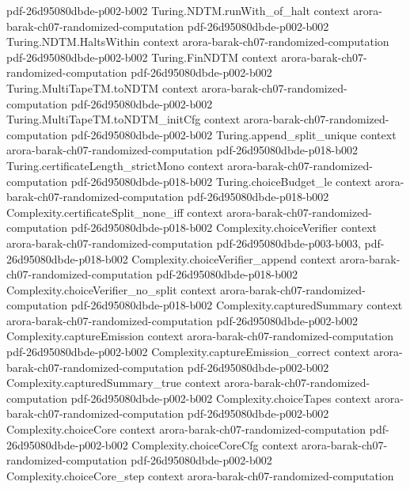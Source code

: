 \begin{theorem}
  {pdf-26d95080dbde-p002-b002}
\proofstep
  {Turing.NDTM.runWith_of_halt}
  {context}
  {arora-barak-ch07-randomized-computation}
  {pdf-26d95080dbde-p002-b002}
\proofstep
  {Turing.NDTM.HaltsWithin}
  {context}
  {arora-barak-ch07-randomized-computation}
  {pdf-26d95080dbde-p002-b002}
\proofstep
  {Turing.FinNDTM}
  {context}
  {arora-barak-ch07-randomized-computation}
  {pdf-26d95080dbde-p002-b002}
\proofstep
  {Turing.MultiTapeTM.toNDTM}
  {context}
  {arora-barak-ch07-randomized-computation}
  {pdf-26d95080dbde-p002-b002}
\proofstep
  {Turing.MultiTapeTM.toNDTM_initCfg}
  {context}
  {arora-barak-ch07-randomized-computation}
  {pdf-26d95080dbde-p002-b002}
\proofstep
  {Turing.append_split_unique}
  {context}
  {arora-barak-ch07-randomized-computation}
  {pdf-26d95080dbde-p018-b002}
\proofstep
  {Turing.certificateLength_strictMono}
  {context}
  {arora-barak-ch07-randomized-computation}
  {pdf-26d95080dbde-p018-b002}
\proofstep
  {Turing.choiceBudget_le}
  {context}
  {arora-barak-ch07-randomized-computation}
  {pdf-26d95080dbde-p018-b002}
\proofstep
  {Complexity.certificateSplit_none_iff}
  {context}
  {arora-barak-ch07-randomized-computation}
  {pdf-26d95080dbde-p018-b002}
\proofstep
  {Complexity.choiceVerifier}
  {context}
  {arora-barak-ch07-randomized-computation}
  {pdf-26d95080dbde-p003-b003,
    pdf-26d95080dbde-p018-b002}
\proofstep
  {Complexity.choiceVerifier_append}
  {context}
  {arora-barak-ch07-randomized-computation}
  {pdf-26d95080dbde-p018-b002}
\proofstep
  {Complexity.choiceVerifier_no_split}
  {context}
  {arora-barak-ch07-randomized-computation}
  {pdf-26d95080dbde-p018-b002}
\proofstep
  {Complexity.capturedSummary}
  {context}
  {arora-barak-ch07-randomized-computation}
  {pdf-26d95080dbde-p002-b002}
\proofstep
  {Complexity.captureEmission}
  {context}
  {arora-barak-ch07-randomized-computation}
  {pdf-26d95080dbde-p002-b002}
\proofstep
  {Complexity.captureEmission_correct}
  {context}
  {arora-barak-ch07-randomized-computation}
  {pdf-26d95080dbde-p002-b002}
\proofstep
  {Complexity.capturedSummary_true}
  {context}
  {arora-barak-ch07-randomized-computation}
  {pdf-26d95080dbde-p002-b002}
\proofstep
  {Complexity.choiceTapes}
  {context}
  {arora-barak-ch07-randomized-computation}
  {pdf-26d95080dbde-p002-b002}
\proofstep
  {Complexity.choiceCore}
  {context}
  {arora-barak-ch07-randomized-computation}
  {pdf-26d95080dbde-p002-b002}
\proofstep
  {Complexity.choiceCoreCfg}
  {context}
  {arora-barak-ch07-randomized-computation}
  {pdf-26d95080dbde-p002-b002}
\proofstep
  {Complexity.choiceCore_step}
  {context}
  {arora-barak-ch07-randomized-computation}

\end{theorem}
